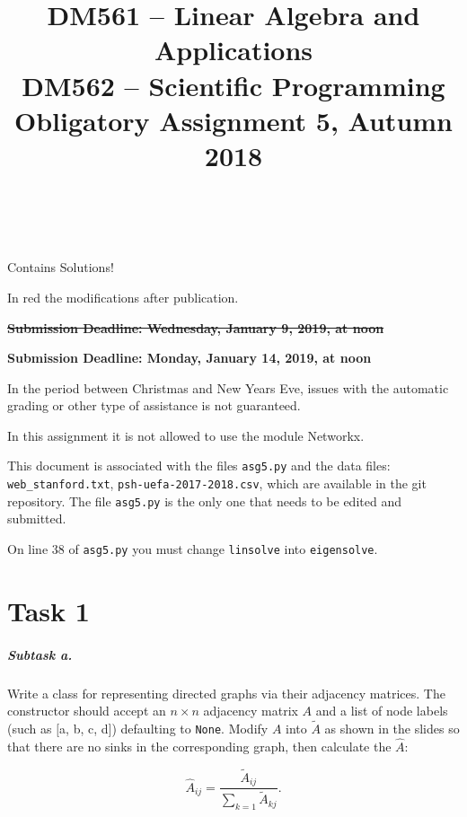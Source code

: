 \documentclass[a4paper,10pt]{article}
\title{%
\begin{flushleft}
  DM561 -- Linear Algebra and Applications\\
  DM562 -- Scientific Programming\\[0.3cm]
{\Large Obligatory Assignment 5, Autumn 2018} %
\\
\hrulefill
\\[-1.8cm]
\end{flushleft}
}
\author{}
\date{}
\begin{document}
\maketitle



\begin{solution}
Contains Solutions!
\end{solution}

\color{red}In red the modifications after publication.\color{black}

\begin{center}
\marginnote{---}\sout{{\bf Submission Deadline: Wednesday, January 9, 2019, at noon}}

\color{red}
  {\bf Submission Deadline: Monday, January 14, 2019, at noon}
\color{black}
\end{center}


In the period between Christmas and New Years Eve, issues with the
automatic grading or other type of assistance is not guaranteed.

\medskip
In this assignment it is not allowed to use the module Networkx.

\medskip
This document is associated with the files \texttt{asg5.py} and the data files:\\
\texttt{web\_stanford.txt}, \texttt{psh-uefa-2017-2018.csv}, which are available
in the git repository. The file \texttt{asg5.py} is the only one that needs to be
edited and submitted.

\medskip
\color{red}
\marginnote{---}On line 38 of \texttt{asg5.py} you must change \lstinline{linsolve} into
\lstinline{eigensolve}.
\color{black}


\section*{Task 1}

\subparagraph{Subtask a.}\label{subtask-a.}

Write a class for representing directed graphs via their adjacency
matrices. The constructor should accept an \(n\times n\) adjacency
matrix \(A\) and a list of node labels (such as \([\)a, b, c, d\(]\))
defaulting to \texttt{None}. Modify \(A\) into \(\widetilde{A}\) as
shown in the slides so that there are no sinks in the corresponding
graph, then calculate the \(\widehat{A}\):

\[
\widehat{A}_{ij} = \frac{\widetilde{A}_{ij}}{\sum_{k=1}\widetilde{A}_{kj}}.
\]
\end{document}
